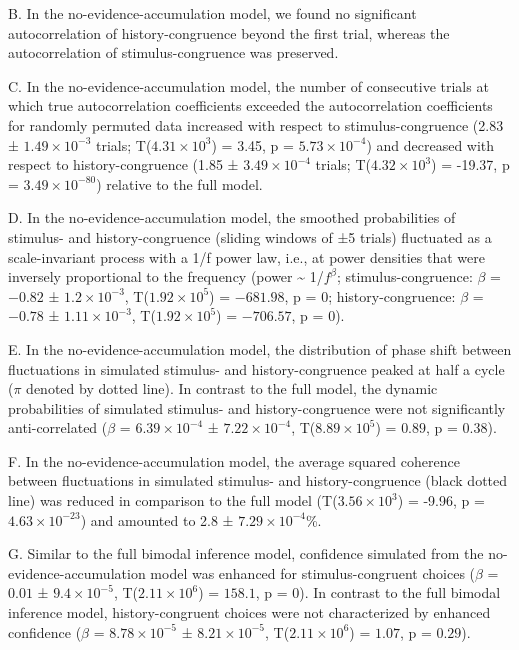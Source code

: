\documentclass[
]{article}
\begin{document}
B. In the no-evidence-accumulation model, we found no significant
autocorrelation of history-congruence beyond the first trial, whereas
the autocorrelation of stimulus-congruence was preserved.

C. In the no-evidence-accumulation model, the number of consecutive
trials at which true autocorrelation coefficients exceeded the
autocorrelation coefficients for randomly permuted data increased with
respect to stimulus-congruence (2.83 ± \ensuremath{1.49\times 10^{-3}}
trials; T(\ensuremath{4.31\times 10^{3}}) = 3.45, p =
\(\ensuremath{5.73\times 10^{-4}}\)) and decreased with respect to
history-congruence (1.85 ± \ensuremath{3.49\times 10^{-4}} trials;
T(\ensuremath{4.32\times 10^{3}}) = -19.37, p =
\(\ensuremath{3.49\times 10^{-80}}\)) relative to the full model.

D. In the no-evidence-accumulation model, the smoothed probabilities of
stimulus- and history-congruence (sliding windows of ±5 trials)
fluctuated as a scale-invariant process with a 1/f power law, i.e., at
power densities that were inversely proportional to the frequency (power
\textasciitilde{} 1/\(f^\beta\); stimulus-congruence: \(\beta\) =
\(-0.82\) ± \(\ensuremath{1.2\times 10^{-3}}\),
T(\(\ensuremath{1.92\times 10^{5}}\)) = \(-681.98\), p = \(0\);
history-congruence: \(\beta\) = \(-0.78\) ±
\(\ensuremath{1.11\times 10^{-3}}\),
T(\(\ensuremath{1.92\times 10^{5}}\)) = \(-706.57\), p = \(0\)).

E. In the no-evidence-accumulation model, the distribution of phase
shift between fluctuations in simulated stimulus- and history-congruence
peaked at half a cycle (\(\pi\) denoted by dotted line). In contrast to
the full model, the dynamic probabilities of simulated stimulus- and
history-congruence were not significantly anti-correlated (\(\beta\) =
\(\ensuremath{6.39\times 10^{-4}}\) ±
\(\ensuremath{7.22\times 10^{-4}}\),
T(\(\ensuremath{8.89\times 10^{5}}\)) = \(0.89\), p = \(0.38\)).

F. In the no-evidence-accumulation model, the average squared coherence
between fluctuations in simulated stimulus- and history-congruence
(black dotted line) was reduced in comparison to the full model
(T(\ensuremath{3.56\times 10^{3}}) = -9.96, p =
\(\ensuremath{4.63\times 10^{-23}}\)) and amounted to 2.8 ±
\ensuremath{7.29\times 10^{-4}}\%.

G. Similar to the full bimodal inference model, confidence simulated
from the no-evidence-accumulation model was enhanced for
stimulus-congruent choices (\(\beta\) = \(0.01\) ±
\(\ensuremath{9.4\times 10^{-5}}\),
T(\(\ensuremath{2.11\times 10^{6}}\)) = \(158.1\), p = \(0\)). In
contrast to the full bimodal inference model, history-congruent choices
were not characterized by enhanced confidence (\(\beta\) =
\(\ensuremath{8.78\times 10^{-5}}\) ±
\(\ensuremath{8.21\times 10^{-5}}\),
T(\(\ensuremath{2.11\times 10^{6}}\)) = \(1.07\), p = \(0.29\)).
\end{document}
